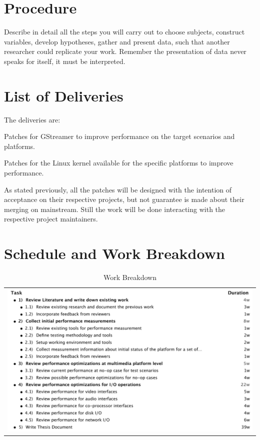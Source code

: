 \section{Procedure}
Describe in detail all the steps you will carry out to choose subjects, construct variables, develop hypotheses, gather and present data, such that another researcher could replicate your work.
Remember the presentation of data never speaks for itself, it must be interpreted.

\section{List of Deliveries}
The deliveries are:
\begin{enumerate*}
\item Patches for GStreamer to improve performance on the target scenarios and platforms.
\item Patches for the Linux kernel available for the specific platforms to improve performance.
\end{enumerate*}

As stated previously, all the patches will be designed with the intention of acceptance on their respective projects, but not guarantee is made about their merging on mainstream. Still the work will be done interacting with the respective project maintainers.

\section{Schedule and Work Breakdown}

\begin{table}[tph]
\caption{Work Breakdown} \centering
\begin{tabular}{c}
\includegraphics[width=1.0\textwidth]{images/Outline.pdf}
\end{tabular}
\end{table}

